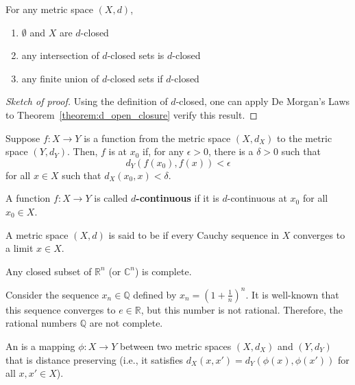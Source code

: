 \begin{corollary}
For any metric space $(X,d)$,
\begin{enumerate}
\item $\emptyset$ and $X$ are $d$-closed
\item any intersection of $d$-closed sets is $d$-closed
\item any finite union of $d$-closed sets if $d$-closed
\end{enumerate}
\end{corollary}
\begin{proof}[Sketch of proof]
Using the definition of $d$-closed, one can apply De Morgan's Laws to Theorem~\ref{theorem:d_open_closure} verify this result.
\end{proof}

\begin{definition}
Suppose $f: X \rightarrow Y$ is a function from the metric space $(X,d_X)$ to the metric space $(Y,d_Y)$.
Then, $f$ is  at $x_0$ if, for any $\epsilon> 0$, there is a $\delta >0$ such that 
\[ d_Y \left( f(x_0),f(x) \right) < \epsilon\]
for all $x\in X$ such that $d_X(x_0,x)< \delta$.
\end{definition}

\begin{definition}
A function $f : X \rightarrow Y$ is called \textbf{$d$-continuous} if it is $d$-continuous at $x_0$ for all $x_0 \in X$.
\end{definition}

\begin{definition}
A metric space $(X,d)$ is said to be  if every Cauchy sequence in $X$ converges to a limit $x \in X$.
\end{definition}

\begin{example}
Any closed subset of $\mathbb{R}^n$ (or $\mathbb{C}^n$) is complete.
\end{example}

\begin{example}
Consider the sequence $x_n \in \mathbb{Q}$ defined by $x_n = \left( 1 + \frac{1}{n} \right)^n$.
It is well-known that this sequence converges to $e\in \mathbb{R}$, but this number is not rational.
Therefore, the rational numbers $\mathbb{Q}$ are not complete.
\end{example}

\begin{definition}
An  is a mapping $\phi : X \rightarrow Y$ between two metric spaces $(X,d_X)$ and $(Y,d_Y)$ that is distance preserving (i.e., it satisfies $d_X (x,x') = d_Y \left(\phi(x),\phi(x')\right)$ for all $x,x'\in X$).
\end{definition}

